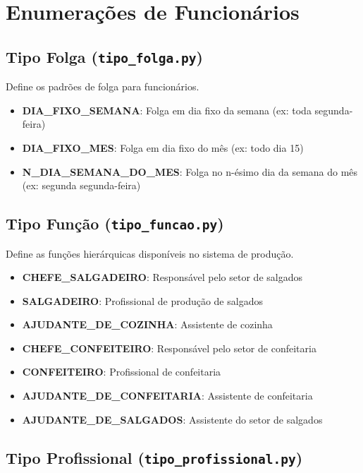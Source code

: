 \documentclass[11pt,a4paper]{article}
\begin{document}
\section{Enumerações de Funcionários}

\subsection{Tipo Folga (\texttt{tipo\_folga.py})}

Define os padrões de folga para funcionários.

\begin{itemize}[leftmargin=2cm]
    \item \textbf{DIA\_FIXO\_SEMANA}: Folga em dia fixo da semana (ex: toda segunda-feira)
    \item \textbf{DIA\_FIXO\_MES}: Folga em dia fixo do mês (ex: todo dia 15)
    \item \textbf{N\_DIA\_SEMANA\_DO\_MES}: Folga no n-ésimo dia da semana do mês (ex: segunda segunda-feira)
\end{itemize}

\subsection{Tipo Função (\texttt{tipo\_funcao.py})}

Define as funções hierárquicas disponíveis no sistema de produção.

\begin{itemize}[leftmargin=2cm]
    \item \textbf{CHEFE\_SALGADEIRO}: Responsável pelo setor de salgados
    \item \textbf{SALGADEIRO}: Profissional de produção de salgados
    \item \textbf{AJUDANTE\_DE\_COZINHA}: Assistente de cozinha
    \item \textbf{CHEFE\_CONFEITEIRO}: Responsável pelo setor de confeitaria
    \item \textbf{CONFEITEIRO}: Profissional de confeitaria
    \item \textbf{AJUDANTE\_DE\_CONFEITARIA}: Assistente de confeitaria
    \item \textbf{AJUDANTE\_DE\_SALGADOS}: Assistente do setor de salgados
\end{itemize}

\subsection{Tipo Profissional (\texttt{tipo\_profissional.py})}
\end{document}
